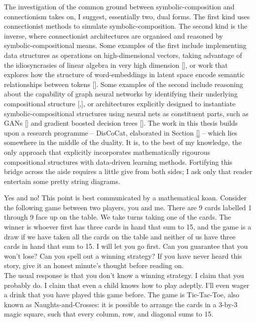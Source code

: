 The investigation of the common ground between symbolic-composition and connectionism takes on, I suggest, essentially two, dual forms. The first kind uses connectionist methods to simulate symbolic-composition. The second kind is the inverse, where connectionist architectures are organised and reasoned by symbolic-compositional means. Some examples of the first include implementing data structures as operations on high-dimensional vectors, taking advantage of the idiosyncrasies of linear algebra in very high dimension [], or work that explores how the structure of word-embeddings in latent space encode semantic relationships between tokens []. Some examples of the second include reasoning about the capability of graph neural networks by identifying their underlying compositional structure [,], or architectures explicitly designed to instantiate symbolic-compositional structures using neural nets as constituent parts, such as GANs [] and gradient boosted decision trees []. The work in this thesis builds upon a research programme -- DisCoCat, elaborated in Section \ref{} -- which lies somewhere in the middle of the duality. It is, to the best of my knowledge, the only approach that explicitly incorporates mathematically rigourous compositional structures with data-driven learning methods. Fortifying this bridge across the aisle requires a little give from both sides; I ask only that reader entertain some pretty string diagrams.


Yes and no! This point is best communicated by a mathematical koan. Consider the following game between two players, you and me. There are 9 cards labelled 1 through 9 face up on the table. We take turns taking one of the cards. The winner is whoever first has three cards in hand that sum to 15, and the game is a draw if we have taken all the cards on the table and neither of us have three cards in hand that sum to 15. I will let you go first. Can you guarantee that you won't lose? Can you spell out a winning strategy? If you have never heard this story, give it an honest minute's thought before reading on.\\

The usual response is that you don't know a winning strategy. I claim that you probably do. I claim that even a child knows how to play adeptly. I'll even wager a drink that you have played this game before. The game is Tic-Tac-Toe, also known as Naughts-and-Crosses: it is possible to arrange the cards in a 3-by-3 magic square, such that every column, row, and diagonal sums to 15.\\

